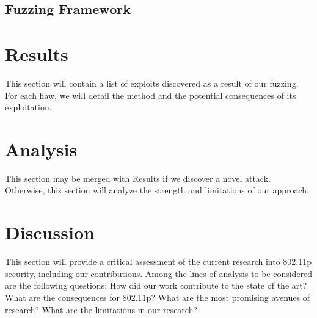 \documentclass[conference]{IEEEtran}
\begin{document}
\subsection{Fuzzing Framework}


\section{Results}
This section will contain a list of exploits discovered as a result of our fuzzing. For each flaw, we will detail the method and the potential consequences of its exploitation.

\section{Analysis}
This section may be merged with Results if we discover a novel attack. Otherwise, this section will analyze the strength and limitations of our approach.

\section{Discussion}
This section will provide a critical assessment of the current research into 802.11p security, including our contributions. Among the lines of analysis to be considered are the following questions: How did our work contribute to the state of the art? What are the consequences for 802.11p? What are the most promising avenues of research? What are the limitations in our research?



\end{document}
